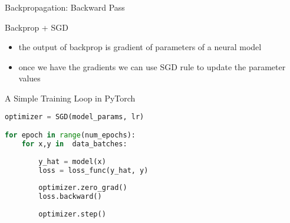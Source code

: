 \begin{frame}{Backpropagation: Backward Pass}
\end{frame}
\begin{frame}{Backprop + SGD}
\begin{itemize}
    \item<1-> the output of backprop is gradient of parameters of a neural model
    \item<2-> once we have the gradients we can use SGD rule to update the parameter values
\end{itemize}
\end{frame}
\begin{frame}[fragile]{A Simple Training Loop in PyTorch}
\begin{lstlisting}[language=Python]
optimizer = SGD(model_params, lr)

for epoch in range(num_epochs):
    for x,y in  data_batches:
        
        y_hat = model(x) 
        loss = loss_func(y_hat, y)
        
        optimizer.zero_grad() 
        loss.backward()
        
        optimizer.step()
\end{lstlisting}
\end{frame}